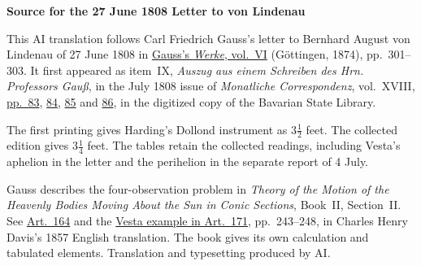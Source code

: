 \clearpage\thispagestyle{empty}
\begin{center}\textbf{Source for the 27 June 1808 Letter to von Lindenau}\end{center}
\noindent This AI translation follows Carl Friedrich Gauss’s letter to Bernhard August von Lindenau of 27 June 1808 in \href{https://gdz.sub.uni-goettingen.de/id/PPN236007467}{Gauss’s \textit{Werke}, vol.~VI} (Göttingen, 1874), pp.~301--303. It first appeared as item~IX, \textit{Auszug aus einem Schreiben des Hrn. Professors Gauß}, in the July 1808 issue of \textit{Monatliche Correspondenz}, vol.~XVIII, \href{https://www.digitale-sammlungen.de/en/view/bsb10538609?page=95}{pp.~83}, \href{https://www.digitale-sammlungen.de/en/view/bsb10538609?page=96}{84}, \href{https://www.digitale-sammlungen.de/en/view/bsb10538609?page=97}{85} and \href{https://www.digitale-sammlungen.de/en/view/bsb10538609?page=98}{86}, in the digitized copy of the Bavarian State Library.
\par\medskip
The first printing gives Harding’s Dollond instrument as $3\tfrac12$ feet. The collected edition gives $3\tfrac14$ feet. The tables retain the collected readings, including Vesta’s aphelion in the letter and the perihelion in the separate report of 4 July.
\par\medskip
Gauss describes the four-observation problem in \textit{Theory of the Motion of the Heavenly Bodies Moving About the Sun in Conic Sections}, Book~II, Section~II. See \href{https://www2.karlin.mff.cuni.cz/~tuma/Aplikace21/theoryofmotionof00gausuoft.pdf#page=258}{Art.~164} and the \href{https://www2.karlin.mff.cuni.cz/~tuma/Aplikace21/theoryofmotionof00gausuoft.pdf#page=267}{Vesta example in Art.~171}, pp.~243--248, in Charles Henry Davis’s 1857 English translation. The book gives its own calculation and tabulated elements. Translation and typesetting produced by AI.
\clearpage
